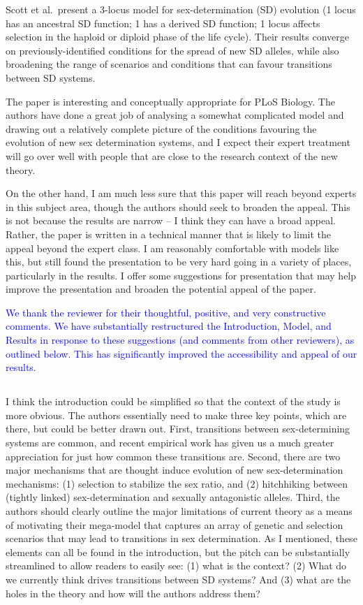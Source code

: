 \documentclass[10pt,letterpaper]{article}
\begin{document}
Scott et al.\ present a 3-locus model for sex-determination (SD) evolution (1 locus has an ancestral SD function; 1 has a derived SD function; 1 locus affects selection in the haploid or diploid phase of the life cycle). Their results converge on previously-identified conditions for the spread of new SD alleles, while also broadening the range of scenarios and conditions that can favour transitions between SD systems.

The paper is interesting and conceptually appropriate for PLoS Biology. The authors have done a great job of analysing a somewhat complicated model and drawing out a relatively complete picture of the conditions favouring the evolution of new sex determination systems, and I expect their expert treatment will go over well with people that are close to the research context of the new theory.

On the other hand, I am much less sure that this paper will reach beyond experts in this subject area, though the authors should seek to broaden the appeal. This is not because the results are narrow -- I think they can have a broad appeal. Rather, the paper is written in a technical manner that is likely to limit the appeal beyond the expert class. I am reasonably comfortable with models like this, but still found the presentation to be very hard going in a variety of places, particularly in the results. I offer some suggestions for presentation that may help improve the presentation and broaden the potential appeal of the paper.

\textcolor{blue}{
We thank the reviewer for their thoughtful, positive, and very constructive comments. We have substantially restructured the Introduction, Model, and Results in response to these suggestions (and comments from other reviewers), as outlined below. 
This has significantly improved the accessibility and appeal of our results. 
}

\noindent\subsection{}
I think the introduction could be simplified so that the context of the study is more obvious. The authors essentially need to make three key points, which are there, but could be better drawn out. First, transitions between sex-determining systems are common, and recent empirical work has given us a much greater appreciation for just how common these transitions are. Second, there are two major mechanisms that are thought induce evolution of new sex-determination mechanisms: (1) selection to stabilize the sex ratio, and (2) hitchhiking between (tightly linked) sex-determination and sexually antagonistic alleles. Third, the authors should clearly outline the major limitations of current theory as a means of motivating their mega-model that captures an array of genetic and selection scenarios that may lead to transitions in sex determination. As I mentioned, these elements can all be found in the introduction, but the pitch can be substantially streamlined to allow readers to easily see: (1) what is the context? (2) What do we currently think drives transitions between SD systems? And (3) what are the holes in the theory and how will the authors address them?
\end{document}
